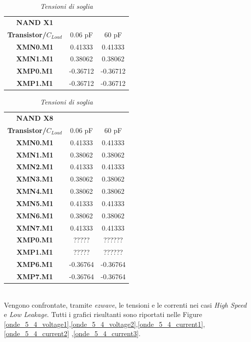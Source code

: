 \begin{table}[!h]\footnotesize
	\centering
	\begin{tabular}{|c|c|c|}
		\hline
		\textbf{NAND X1} &&\\
		\textbf{Transistor/$C_{Load}$}&0.06 pF & 60 pF\\
		\hline
		\textbf{XMN0.M1} &0.41333&0.41333\\
		\textbf{XMN1.M1} &0.38062&0.38062 \\
		\textbf{XMP0.M1}&-0.36712&-0.36712 \\
		\textbf{XMP1.M1}&-0.36712&-0.36712\\
		\hline
	\end{tabular}
	\caption{\textit{Tensioni di soglia}}
	\label{Tab5_21}
\end{table}
\begin{table}[!h]\footnotesize
	\centering
	\begin{tabular}{|c|c|c|}
		\hline
		\textbf{NAND X8} &&\\
		
		\textbf{Transistor/$C_{Load}$}&0.06 pF & 60 pF\\
		\hline
		\textbf{XMN0.M1} &0.41333&0.41333\\	
		\textbf{XMN1.M1} &0.38062&0.38062 \\
		\textbf{XMN2.M1} &0.41333&0.41333\\
		\textbf{XMN3.M1} &0.38062&0.38062 \\
		\textbf{XMN4.M1} &0.38062&0.38062 \\
		\textbf{XMN5.M1} &0.41333&0.41333\\
		\textbf{XMN6.M1} &0.38062&0.38062 \\
		\textbf{XMN7.M1} &0.41333&0.41333\\
		\textbf{XMP0.M1}&?????&?????? \\
		\textbf{XMP1.M1}&?????&??????\\
		\textbf{XMP6.M1}&-0.36764&-0.36764 \\
		\textbf{XMP7.M1}&-0.36764&-0.36764\\
		
		\hline
	\end{tabular}
	\caption{\textit{Tensioni di soglia}}
	\label{Tab5_22}
\end{table}
\\
Vengono confrontate, tramite \textit{ezwave}, le tensioni e le correnti nei casi \textit{High Speed} e \textit{Low Leakage}. Tutti i grafici risultanti sono riportati nelle Figure \ref{onde_5_4_voltage1},\ref{onde_5_4_voltage2},\ref{onde_5_4_current1},\ref{onde_5_4_current2} ,\ref{onde_5_4_current3}.
